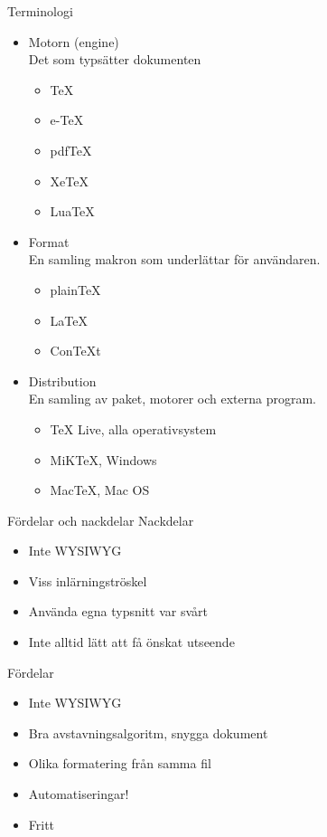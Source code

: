 \documentclass[xcolor=x11names,compress,swedish]{beamer}
\newcommand{\acr}[1]{{\small\MakeUppercase{#1}}}
\begin{document}
	\begin{frame}{Terminologi}
		\begin{itemize}
			\item Motorn (engine)\\
					Det som typsätter dokumenten
			\begin{itemize}
				\item TeX
				\item e-TeX
				\item pdfTeX
				\item XeTeX
				\item LuaTeX
			\end{itemize}
			\item Format\\
					En samling makron som underlättar för användaren.
			\begin{itemize}
				\item plainTeX
				\item LaTeX
				\item ConTeXt
			\end{itemize}
			\item Distribution\\
					En samling av paket, motorer och externa program.
			\begin{itemize}
				\item TeX Live, alla operativsystem
				\item MiKTeX, Windows
				\item MacTeX, Mac OS
			\end{itemize}
		\end{itemize}
	\end{frame}
	
	\begin{frame}{Fördelar och nackdelar}
		Nackdelar
		\begin{itemize}
			\item Inte \acr{wysiwyg}
			\item Viss inlärningströskel
			\item Använda egna typsnitt var svårt
			\item Inte alltid lätt att få önskat utseende
		\end{itemize}
		\pause
		Fördelar
		\begin{itemize}
			\item Inte \acr{wysiwyg}
			\item Bra avstavningsalgoritm, snygga dokument
			\item Olika formatering från samma fil
			\item Automatiseringar!
			\item Fritt
		\end{itemize}
	\end{frame}
	
\end{document}

